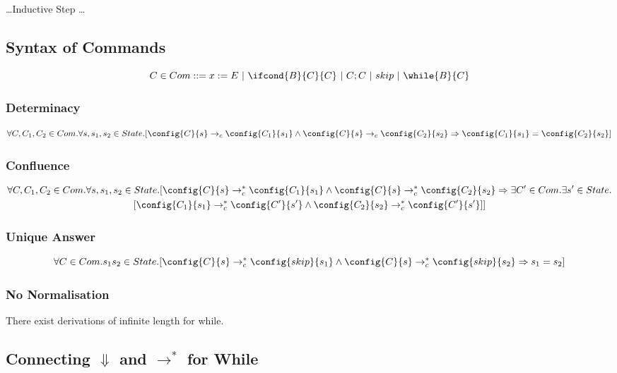 \dots Inductive Step \dots

\subsection{Syntax of Commands}
\[C \in Com ::= x := E \ | \ \ifcond{B}{C}{C} \ | \ C;C \ | \ skip \ | \ \while{B}{C}\]

\subsubsection{Determinacy}	
\[\forall C, C_1, C_2 \in Com . \forall s, s_1, s_2 \in State . [\config{C}{s} \to_c \config{C_1}{s_1} \land \config{C}{s} \to_c \config{C_2}{s_2} \Rightarrow \config{C_1}{s_1} = \config{C_2}{s_2}]\]
	
\subsubsection{Confluence}	
\begin{multline*}
	\forall C, C_1, C_2 \in Com . \forall s, s_1, s_2 \in State . [\config{C}{s} \to_c^* \config{C_1}{s_1} \land \config{C}{s} \to_c^* \config{C_2}{s_2} \Rightarrow \exists C' \in Com . \exists s' \in State . \\ [\config{C_1}{s_1} \to_c^* \config{C'}{s'} \land \config{C_2}{s_2} \to_c^* \config{C'}{s'}]]
\end{multline*}
	
\subsubsection{Unique Answer}
\[\forall C \in Com . s_1 s_2 \in State . [\config{C}{s} \to_c^* \config{skip}{s_1} \land \config{C}{s} \to_c^* \config{skip}{s_2} \Rightarrow s_1 = s_2]\]

\subsubsection{No Normalisation}
There exist derivations of infinite length for while.

\subsection{Connecting $\Downarrow$ and $\to^*$ for While}

